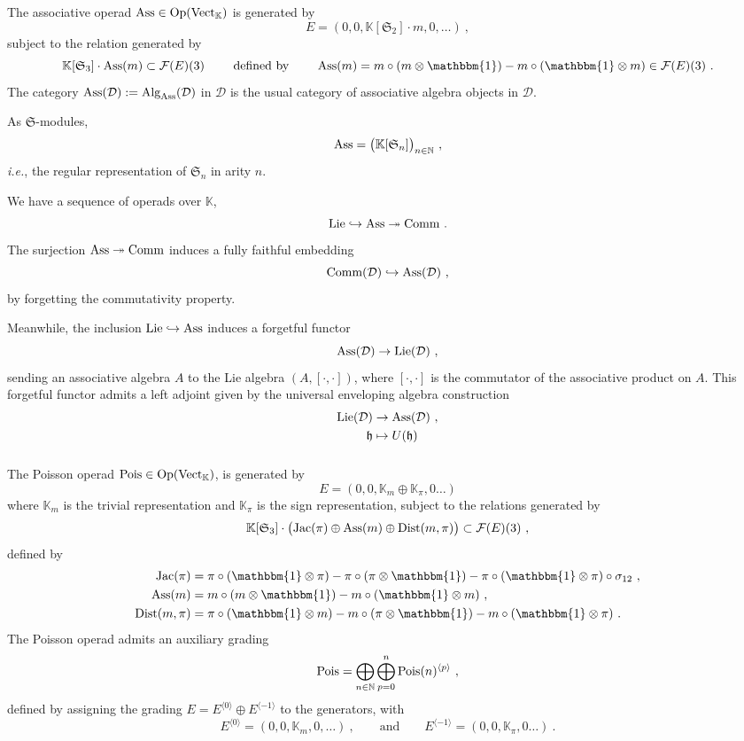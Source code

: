 \documentclass[11pt]{amsart}
\numberwithin{equation}{section}
\theoremstyle{definition}
\newcommand{\bb}{\mathbb}
\newcommand{\mc}{\mathcal}
\newcommand{\mf}{\mathfrak}
\newcommand{\D}{{\mathcal{D}}}
\DeclareMathOperator{\Vect}{Vect}
\newcommand{\K}{{\bb K}}
\newcommand{\ik}{{\bb K}}
\newcommand{\Alg}{{\textup{Alg}}}
\newcommand{\Pois}{{\textup{Pois}}}
\newcommand{\Comm}{{\textup{Comm}}}
\newcommand{\Lie}{{\textup{Lie}}}
\newcommand{\Op}{{\textup{Op}}}
\newcommand{\Ass}{{\textup{Ass}}}
\newcommand{\Ss}{{{\mf{S}}}}
\newcommand{\0}{{\textbf{0}}}
\newcommand{\id}{{\textup{id}}}
\def\IN{\mathbb{N}}
\def\FF{{\mc F}}
\def\hf{\mathfrak{h}}
\def \mf{\mathfrak}
\def \id{\mathbbm{1}}
\def \Op{\mathrm{Op}}
\def \ie{{\it i.e.}}
\begin{document}
\subsubsection{}\label{Asseg} 

The associative operad $\Ass\in \Op(\Vect_\K)$ is generated by 
\[
E = (0,0,\ik[\Ss_2]\cdot m,0,\dots)~,
\]
subject to the relation generated by
\[
  \ik[\Ss_3]\cdot \Ass(m)\subset \FF(E)(3) \quad\quad \text{ defined by }\quad\quad \text{Ass}(m)=m\circ (m\otimes \id) - m \circ (\id \otimes m) \in \mc F(E)(3)~.
\]
The category $\Ass(\mc D):=\Alg_{\Ass }(\mc D)$ in $\mc D$ is the usual category of associative algebra objects in $\mc D$. 

As $\Ss$-modules,
\[
\Ass = \big(\ik[\Ss_n]\big)_{n\in \IN}~,
\]
\ie, the regular representation of $\Ss_n$ in arity $n$.


We have a sequence of operads over $\ik$,
\[
\Lie\hookrightarrow\Ass \twoheadrightarrow \Comm~.
\]
The surjection $\Ass \twoheadrightarrow \Comm$ induces a fully faithful embedding
\[
\Comm(\D) \hookrightarrow \Ass(\D)~,
\]
by forgetting the commutativity property.

Meanwhile, the inclusion $\Lie\hookrightarrow \Ass$ induces a forgetful functor
\[
\Ass(\D)\rightarrow \Lie(\D)~,
\]
sending an associative algebra $A$ to the Lie algebra $(A,[\cdot,\cdot])$, where $[\cdot,\cdot]$ is the commutator of the associative product on $A$. This forgetful functor admits a left adjoint given by the universal enveloping algebra construction
\begin{align*}
\Lie(\D) &\rightarrow \Ass(\D)~,\\
\hf &\mapsto U(\hf)~
\end{align*}



\subsubsection{}\label{Poisopdefn}

The Poisson operad $\Pois\in\Op(\Vect_\K)$, is generated by
\[
E = (0,0, \K_m\oplus \K_\pi,0\dots)
\]
where $\K_m$ is the trivial representation and $\K_\pi$ is the sign representation, subject to the relations generated by
\[
\ik[\Ss_3]\cdot\big(\text{Jac}(\pi)\oplus\Ass(m)\oplus\text{Dist}(m,\pi)\big)\subset \FF(E)(3)~,
\]
defined by
\begin{align*}
 \text{Jac}(\pi) & = \pi\circ( \id \otimes \pi) - \pi\circ( \pi\otimes \id) - \pi \circ (\id \otimes \pi)\circ \sigma_{12} \ , \\
  \text{Ass}(m) & =m\circ (m\otimes \id) - m \circ (\id \otimes m)~, \\
 \text{Dist}(m,\pi) & = \pi\circ(\id\otimes m) - m\circ(\pi\otimes \id)  - m \circ ( \id \otimes \pi) \ .
\end{align*}
The Poisson operad admits an auxiliary grading
\[
\Pois = \bigoplus_{n\in\IN}\bigoplus_{p=0}^n \Pois(n)^{\langle p\rangle}~,
\]
defined by assigning the grading $E = E^{\langle 0\rangle}\oplus E^{\langle -1\rangle}$ to the generators, with
\[
E^{\langle 0 \rangle} = (0,0,\ik_m,0,\dots)~,\qquad \text{and} \qquad E^{\langle -1 \rangle}=(0,0,\ik_\pi,0\dots)~.
\]
\end{document}

